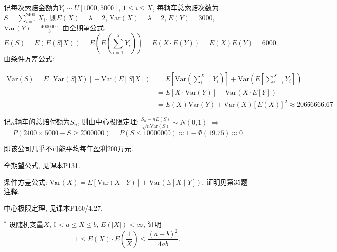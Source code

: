 \documentclass[standard]{ExBook}
\begin{document}
\begin{qitems}
\begin{bbox}
记每次索赔金额为$Y_{i}\sim U[1000,5000]$, $1\leq i\leq X$, 每辆车总索赔次数为$S=\sum\limits_{i=1}^{2400}X_i$. 则$E(X)=\lambda=2$, $\mathrm{Var}(X)=\lambda=2$, $E(Y)=3000$, $\mathrm{Var}(Y)=\displaystyle\frac{4000000}{3}$. 由全期望公式:
$$E(S)=E(E(S|X))=E(E(\sum\limits_{i=1}^{X}Y_i))=E(X\cdot E(Y))=E(X)E(Y)=6000$$
由条件方差公式:
\vspace{-2em}
\begin{center}
\begin{equation}
    \begin{array}{ll}
        \nonumber
\mathrm{Var}(S)=E[\mathrm{Var}(S|X)]+\mathrm{Var}(E[S|X]) & =E[\mathrm{Var}(\sum\limits_{i=1}^{X}Y_i)]+\mathrm{Var}(E[\sum\limits_{i=1}^{X}Y_i])\\
& =E[X\cdot \mathrm{Var}(Y)]+\mathrm{Var}(X\cdot E[Y])\\
& =E(X)\mathrm{Var}(Y)+\mathrm{Var}(X)\left[E(X)\right]^2 \approx 20666666.67
    \end{array}
\end{equation}
\end{center}
记$n$辆车的总赔付额为$S_n$, 则由中心极限定理: $\displaystyle \frac{S_n-nE(S)}{\sqrt{n\mathrm{Var}(S)}}\sim N(0,1)$ $\Longrightarrow$
$$P(2400\times5000-S\geq 2000000)=P(S\leq 10000000) \approx 1-\Phi(19.75) \approx 0$$
    \end{bbox}

\vspace{-5em}

    \begin{bbox}
即该公司几乎不可能平均每年盈利200万元.

\textcolor{themeColor}{\selectfont {} 全期望公式, 见课本P131.}

\textcolor{themeColor}{\selectfont {} 条件方差公式: $\text{Var}(X) = E[\text{Var}(X \mid Y)] + \text{Var}(E[X \mid Y])$. 证明见第35题注释.}

\textcolor{themeColor}{\selectfont {} 中心极限定理, 见课本P160/4.27.}
    \end{bbox}

\vspace{-5em}

    \begin{bbox}
    \begin{shaded}
        \qitem$^{*}$
设随机变量$X$, $0 < a \leq X \leq b$, $E(|X|)<\infty$, 证明
$$1\leq E(X)\cdot E\left(\frac{1}{X}\right)\leq\displaystyle\frac{(a+b)^2}{4ab}.$$
    \end{shaded}
    \end{bbox}


\end{qitems}
\end{document}
